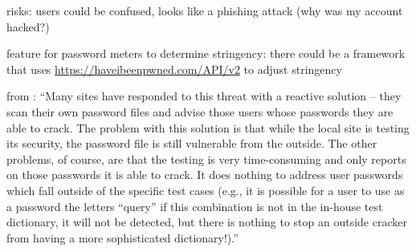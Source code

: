 risks: users could be confused, looks like a phishing attack (why was my account hacked?)

feature for password meters to determine stringency: 
there could be a framework that uses \url{https://haveibeenpwned.com/API/v2} to adjust stringency 

from \cite{Bishop1995ProactivePasswordChecking}: ``Many sites have responded to this threat with a reactive solution -- they scan their own password files and advise those users whose passwords they are able to crack. The problem with this solution is that while the local site is testing its security, the password file is still vulnerable from the outside. The other problems, of course, are that the testing is very time-consuming and only reports on those passwords it is able to crack. It does nothing to address user passwords which fall outside of the specific test cases (e.g., it is possible for a user to use as a password the letters ``query'' if this combination is not in the in-house test dictionary, it will not be detected, but there is nothing to stop an outside cracker from having a more sophisticated dictionary!).''
